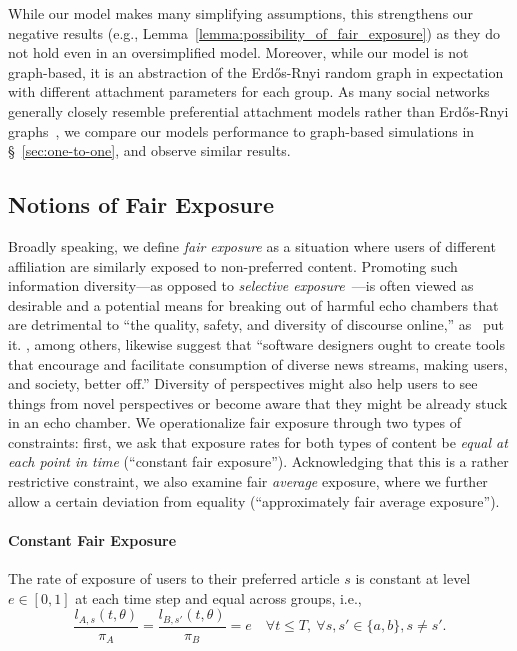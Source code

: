 \documentclass[letterpaper]{article} %
\begin{document}
While our model makes many simplifying assumptions, this strengthens our negative results (e.g., Lemma~\ref{lemma:possibility_of_fair_exposure}) as they do not hold even in an oversimplified model.
%
Moreover, while our model is not graph-based, it is an abstraction of the Erd\H{o}s-Rnyi random graph in expectation with different attachment parameters for each group. 
%
As many social networks generally closely resemble preferential attachment models rather than Erd\H{o}s-Rnyi graphs~\citep{clauset_larremore}, we compare our models performance to graph-based simulations in \S~\ref{sec:one-to-one}, and observe similar results.

\subsection{Notions of Fair Exposure}
Broadly speaking, we define \emph{fair exposure} as a situation where users of different affiliation are similarly exposed to non-preferred content.
%
Promoting such information diversity---as opposed to \emph{selective exposure}~\citep{freedman1965selective}---is often viewed as desirable and a potential means for breaking out of harmful echo chambers that are detrimental to ``the quality, safety, and diversity of discourse online,'' as~\citet{gillani2018me} put it.
%
\citet{garrett2011resisting}, among others, likewise suggest that ``software designers ought to create tools that
encourage and facilitate consumption of diverse news streams, making users, and society, better off.''
%
Diversity of perspectives might also help users to see things from novel perspectives or become aware that they might be already stuck in an echo chamber.
%
We operationalize fair exposure through two types of constraints: first, we ask that exposure rates for both types of content be \emph{equal at each point in time} (``constant fair exposure'').
%
Acknowledging that this is a rather restrictive constraint, we also examine fair \emph{average} exposure, where we further allow a certain deviation from equality (``approximately fair average exposure'').

\paragraph{Constant Fair Exposure}
The rate of exposure of users  to their preferred article $s$ is constant at level $e\in [0,1]$ at each time step and equal across groups, i.e.,
\footnotesize
\begin{equation}
    \label{eq:constant_exposure}
    \frac{l_{A,s}(t,\theta)}{\pi_A} = \frac{l_{B,s'}(t,\theta)}{\pi_B}=e\quad 
    \forall t \leq T,\ \forall s,s'\in\{a,b\}, s\neq s'.
\end{equation}
\normalsize
\end{document}
